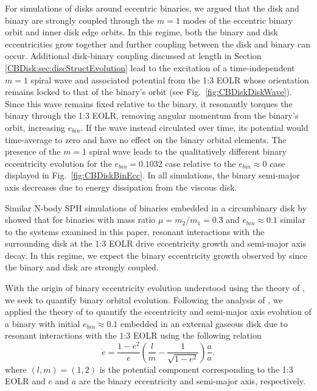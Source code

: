 For simulations of disks around eccentric binaries, we argued that the disk and binary are strongly coupled through the $m = 1$ modes of the eccentric binary orbit and inner disk edge orbits.  In this regime, both the binary and disk eccentricities grow together and further coupling between the disk and binary can occur.  Additional disk-binary coupling discussed at length in Section \ref{CBDisk:sec:discStructEvolution} lead to the excitation of a time-independent $m = 1$ spiral wave and associated potential from the 1:3 EOLR whose orientation remains locked to that of the binary's orbit (see Fig.~\ref{fig:CBDiskDiskWave}).  Since this wave remains fixed relative to the binary, it resonantly torques the binary through the 1:3 EOLR, removing angular momentum from the binary's orbit, increasing $e_{bin}$.  If the wave instead circulated over time, its potential would time-average to zero and have no effect on the binary orbital elements.  The presence of the $m = 1$ spiral wave leads to the qualitatively different binary eccentricity evolution for the $e_{bin} = 0.1032$ case relative to the $e_{bin} \approx 0$ case displayed in Fig.~\ref{fig:CBDiskBinEcc}.  In all simulations, the binary semi-major axis decreases due to energy dissipation from the viscous disk. 

 Similar N-body SPH simulations of
binaries embedded in a circumbinary disk by \citet{Artymowicz1991} showed that for binaries with mass ratio $\mu = m_2/m_1 = 0.3$ and $e_{bin} \approx 0.1$ similar to the systems examined in this paper, resonant interactions with the surrounding disk at the 1:3 EOLR drive eccentricity growth and semi-major axis decay.  In this regime, we expect the binary eccentricity growth observed by \citet{Artymowicz1991} since the binary and disk are strongly coupled.

With the origin of binary eccentricity evolution understood using
the theory of \citet{Papaloizou2001}, we seek to quantify binary orbital
evolution.  Following the analysis of \citet{Dermine2013}, we applied the theory of \citet{Artymowicz1996b,Artymowicz2000} to quantify the eccentricity and semi-major axis 
evolution of a binary with initial $e_{bin} \approx 0.1$ embedded in an external gaseous disk due to resonant interactions with the 1:3 EOLR using the following 
relation
\begin{equation} 
\label{CBDisk:eqn:deda}
\dot{e} = \frac{1 - e^2}{e} \left(\frac{l}{m} - \frac{1}{\sqrt{1 - e^2}}\right)\frac{\dot{a}}{a}.
\end{equation}
where $(l,m) = (1,2)$ is the potential component corresponding to the 1:3 EOLR \citep{Artymowicz1991,Artymowicz2000} and $e$ and $a$ are the binary eccentricity and semi-major axis, respectively.

